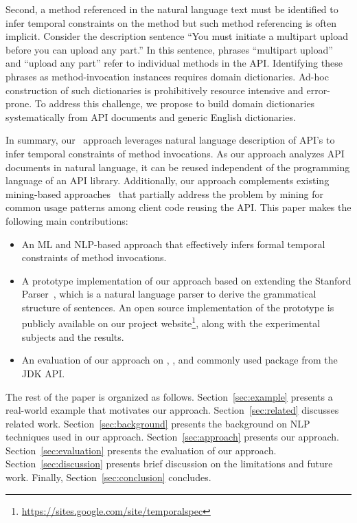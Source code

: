 Second, a method referenced in the natural language text must be identified to infer temporal constraints on the method but such method referencing is often implicit.
Consider the description sentence ``You must initiate a multipart upload before you can upload any part.''
In this sentence, phrases ``multipart upload'' and ``upload any part'' refer to individual methods in the API.
Identifying these phrases as method-invocation instances requires domain dictionaries.
Ad-hoc construction of such dictionaries is prohibitively resource intensive and error-prone.
To address this challenge, we propose to build domain dictionaries systematically from API documents and generic English dictionaries.

In summary, our \tool\ approach leverages natural language description of API's to infer temporal constraints of method invocations.
As our approach analyzes API documents in natural language, it can be reused independent of the programming language of an API library.
Additionally, our approach complements existing mining-based approaches~\cite{buse2012synthesizing, thummalapenta07parseweb, Wang:2013:MSR, Zhong:2009:MMR} that partially address the problem by mining for common usage patterns among client code reusing the API.
This paper makes the following main contributions:


\begin{itemize}
	\item An ML and NLP-based approach that effectively infers formal temporal constraints of method invocations. 
	\item A prototype implementation of our approach based on extending the Stanford Parser~\cite{Klein03}, which is a natural language parser to derive the grammatical structure of sentences.
	An open source implementation of the prototype is publicly available on our project website\footnote{\url{https://sites.google.com/site/temporalspec}}, along with the experimental subjects and the results. 
	\item An evaluation of our approach on \amazonAPI, \paypalAPI, and commonly used package  from the JDK API. 
\end{itemize}


The rest of the paper is organized as follows.
Section~\ref{sec:example} presents a real-world example that motivates our approach.
Section~\ref{sec:related} discusses related work.
Section~\ref{sec:background} presents the  background on NLP techniques used in our approach.
Section~\ref{sec:approach} presents our approach.
Section~\ref{sec:evaluation} presents the evaluation of our approach.
Section~\ref{sec:discussion} presents brief discussion on the limitations and future work.
Finally, Section~\ref{sec:conclusion} concludes.

